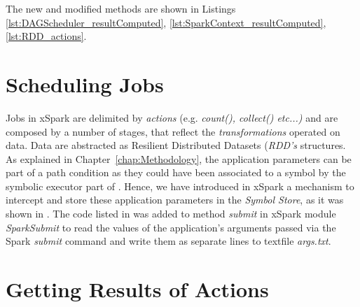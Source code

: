 The new and modified methods are shown in Listings \ref{lst:DAGScheduler_resultComputed}, \ref{lst:SparkContext_resultComputed}, \ref{lst:RDD_actions}.





\section{Scheduling Jobs}\label{sec:scheduling_jobs}
Jobs in xSpark are delimited by \textit{actions} (e.g. \textit{count(), collect()  etc...)} and are composed by a number of stages, that reflect the \textit{transformations} operated on data. Data are abstracted as Resilient Distributed Datasets (\textit{RDD's} structures. As explained in Chapter~\ref{chap:Methodology}, the application parameters can be part of a path condition as they could have been associated to a symbol by the symbolic executor part of \dSymb. Hence, we have introduced in xSpark a mechanism to intercept and store these application parameters in the \tool \textit{Symbol Store}, as it was shown in . The code listed in  was added to method \textit{submit} in xSpark module \textit{SparkSubmit} to read the values of the application's arguments passed via the Spark \textit{submit} command and write them as separate lines to textfile \textit{args.txt}. 

\section{Getting Results of Actions}\label{sec:getting_job_results}

